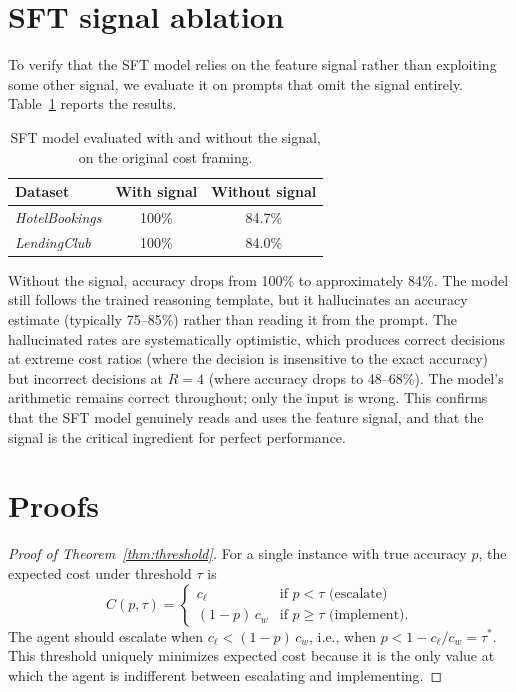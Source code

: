 \documentclass{article}
\begin{document}
\section{SFT signal ablation}
\label{app:sft_ablation}

To verify that the SFT model relies on the feature signal rather than exploiting some other signal, we evaluate it on prompts that omit the signal entirely. Table~\ref{tab:sft_nosignal} reports the results.

\begin{table}[h]
    \centering
    \caption{SFT model evaluated with and without the signal, on the original cost framing.}
    \label{tab:sft_nosignal}
    \begin{tabular}{lcc}
        \toprule
        Dataset & With signal & Without signal \\
        \midrule
        \emph{HotelBookings} & 100\% & 84.7\% \\
        \emph{LendingClub} & 100\% & 84.0\% \\
        \bottomrule
    \end{tabular}
\end{table}

Without the signal, accuracy drops from 100\% to approximately 84\%. The model still follows the trained reasoning template, but it hallucinates an accuracy estimate (typically 75--85\%) rather than reading it from the prompt. The hallucinated rates are systematically optimistic, which produces correct decisions at extreme cost ratios (where the decision is insensitive to the exact accuracy) but incorrect decisions at $R = 4$ (where accuracy drops to 48--68\%). The model's arithmetic remains correct throughout; only the input is wrong. This confirms that the SFT model genuinely reads and uses the feature signal, and that the signal is the critical ingredient for perfect performance.

\section{Proofs}
\label{app:proofs}

\begin{proof}[Proof of Theorem~\ref{thm:threshold}]
For a single instance with true accuracy $p$, the expected cost under threshold $\tau$ is
\[
C(p, \tau) = \begin{cases} c_\ell & \text{if } p < \tau \text{ (escalate)} \\ (1-p) \, c_w & \text{if } p \geq \tau \text{ (implement).} \end{cases}
\]
The agent should escalate when $c_\ell < (1-p) \, c_w$, i.e., when $p < 1 - c_\ell/c_w = \tau^*$. This threshold uniquely minimizes expected cost because it is the only value at which the agent is indifferent between escalating and implementing.
\end{proof}
\end{document}
